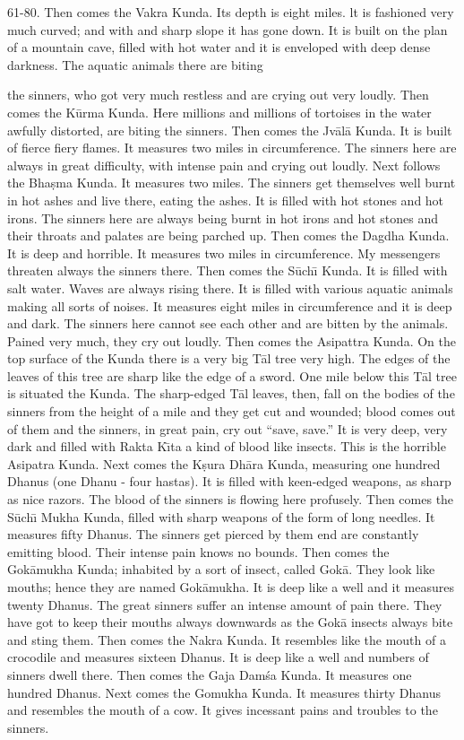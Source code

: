 61-80. Then comes the Vakra Kunda. Its depth is eight miles. lt is fashioned very much curved; and with and sharp slope it has gone down. It is built on the plan of a mountain cave, filled with hot water and it is enveloped with deep dense darkness. The aquatic animals there are biting

the sinners, who got very much restless and are crying out very loudly. Then comes the K\=urma Kunda. Here millions and millions of tortoises in the water awfully distorted, are biting the sinners. Then comes the Jv\=al\=a Kunda. It is built of fierce fiery flames. It measures two miles in circumference. The sinners here are always in great difficulty, with intense pain and crying out loudly. Next follows the Bha\d{s}ma Kunda. It measures two miles. The sinners get themselves well burnt in hot ashes and live there, eating the ashes. It is filled with hot stones and hot irons. The sinners here are always being burnt in hot irons and hot stones and their throats and palates are being parched up. Then comes the Dagdha Kunda. It is deep and horrible. It measures two miles in circumference. My messengers threaten always the sinners there. Then comes the S\=uch\={\i} Kunda. It is filled with salt water. Waves are always rising there. It is filled with various aquatic animals making all sorts of noises. It measures eight miles in circumference and it is deep and dark. The sinners here cannot see each other and are bitten by the animals. Pained very much, they cry out loudly. Then comes the Asipattra Kunda. On the top surface of the Kunda there is a very big T\=al tree very high. The edges of the leaves of this tree are sharp like the edge of a sword. One mile below this T\=al tree is situated the Kunda. The sharp-edged T\=al leaves, then, fall on the bodies of the sinners from the height of a mile and they get cut and wounded; blood comes out of them and the sinners, in great pain, cry out ``save, save.'' It is very deep, very dark and filled with Rakta K\={\i}ta a kind of blood like insects. This is the horrible Asipatra Kunda. Next comes the K\d{s}ura Dh\=ara Kunda, measuring one hundred Dhanus (one Dhanu - four hastas). It is filled with keen-edged weapons, as sharp as nice razors. The blood of the sinners is flowing here profusely. Then comes the S\=uch\={\i} Mukha Kunda, filled with sharp weapons of the form of long needles. It measures fifty Dhanus. The sinners get pierced by them end are constantly emitting blood. Their intense pain knows no bounds. Then comes the Gok\=amukha Kunda; inhabited by a sort of insect, called Gok\=a. They look like mouths; hence they are named Gok\=amukha. It is deep like a well and it measures twenty Dhanus. The great sinners suffer an intense amount of pain there. They have got to keep their mouths always downwards as the Gok\=a insects always bite and sting them. Then comes the Nakra Kunda. It resembles like the mouth of a crocodile and measures sixteen Dhanus. It is deep like a well and numbers of sinners dwell there. Then comes the Gaja Dam\'sa Kunda. It measures one hundred Dhanus. Next comes the Gomukha Kunda. It measures thirty Dhanus and resembles the mouth of a cow. It gives incessant pains and troubles to the sinners.

